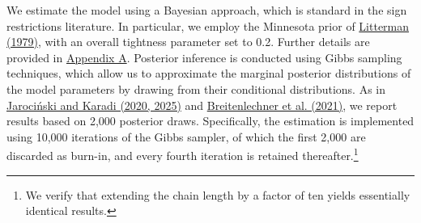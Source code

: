 \documentclass[12pt, reqno]{article}
\begin{document}
We estimate the model using a Bayesian approach, which is standard in the sign restrictions literature. In particular, we employ the Minnesota prior of \hyperlink{Litterman (1979)}{Litterman (1979)}, with an overall tightness parameter set to 0.2. Further details are provided in \hyperlink{Appendix A}{Appendix A}. Posterior inference is conducted using Gibbs sampling techniques, which allow us to approximate the marginal posterior distributions of the model parameters by drawing from their conditional distributions. As in \hyperlink{JK (2020)}{Jarociński and Karadi (2020, 2025)} and \hyperlink{Breitenlechner (2021)}{Breitenlechner et al. (2021)}, we report results based on 2{,}000 posterior draws. Specifically, the estimation is implemented using 10{,}000 iterations of the Gibbs sampler, of which the first 2{,}000 are discarded as burn-in, and every fourth iteration is retained thereafter.\footnote{We verify that extending the chain length by a factor of ten yields essentially identical results.}
\end{document}
